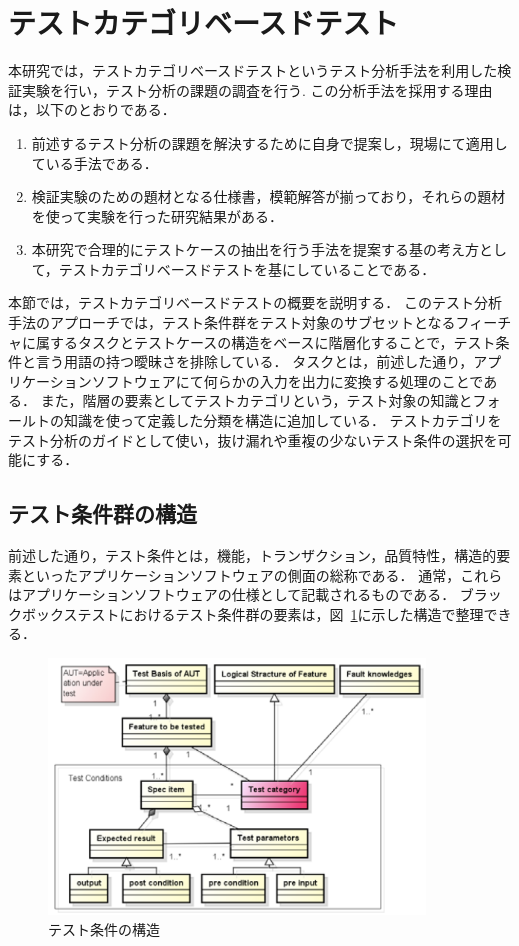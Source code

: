 \section{テストカテゴリベースドテスト}
本研究では，テストカテゴリベースドテストというテスト分析手法を利用した検証実験を行い，テスト分析の課題の調査を行う\cite{yumoto2013test}.
この分析手法を採用する理由は，以下のとおりである．
\begin{enumerate}
\item 前述するテスト分析の課題を解決するために自身で提案し，現場にて適用している手法である．
\item 検証実験のための題材となる仕様書，模範解答が揃っており，それらの題材を使って実験を行った研究結果がある．
\item 本研究で合理的にテストケースの抽出を行う手法を提案する基の考え方として，テストカテゴリベースドテストを基にしていることである．
\end{enumerate}

本節では，テストカテゴリベースドテストの概要を説明する．
このテスト分析手法のアプローチでは，テスト条件群をテスト対象のサブセットとなるフィーチャに属するタスクとテストケースの構造をベースに階層化することで，テスト条件と言う用語の持つ曖昧さを排除している．
タスクとは，前述した通り，アプリケーションソフトウェアにて何らかの入力を出力に変換する処理のことである．
また，階層の要素としてテストカテゴリという，テスト対象の知識とフォールトの知識を使って定義した分類を構造に追加している．
テストカテゴリをテスト分析のガイドとして使い，抜け漏れや重複の少ないテスト条件の選択を可能にする．

\subsection{テスト条件群の構造}
前述した通り，テスト条件とは，機能，トランザクション，品質特性，構造的要素といったアプリケーションソフトウェアの側面の総称である．
通常，これらはアプリケーションソフトウェアの仕様として記載されるものである．
ブラックボックステストにおけるテスト条件群の要素は，図~\ref{fig:D-4-Fig4}に示した構造で整理できる．

\begin{figure}[htbp]
  \begin{center}
  \includegraphics[width=10cm]{./image/D-4-Fig4.png}
  \caption{テスト条件の構造}
  \label{fig:D-4-Fig4}
  \end{center}
   \end{figure}


